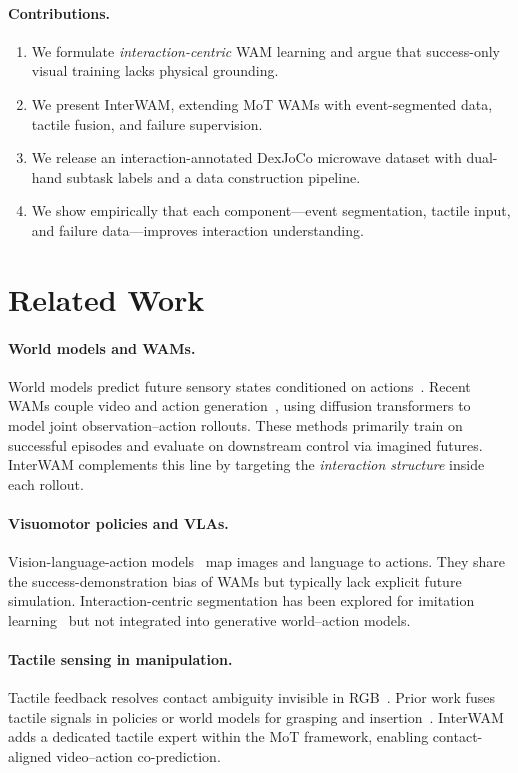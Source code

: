 \documentclass{article}
\begin{document}
\paragraph{Contributions.}
\begin{enumerate}
    \item We formulate \emph{interaction-centric} WAM learning and argue that success-only visual training lacks physical grounding.
    \item We present InterWAM, extending MoT WAMs with event-segmented data, tactile fusion, and failure supervision.
    \item We release an interaction-annotated DexJoCo microwave dataset with dual-hand subtask labels and a data construction pipeline.
    \item We show empirically that each component---event segmentation, tactile input, and failure data---improves interaction understanding.
\end{enumerate}

\section{Related Work}
\label{sec:related}

\paragraph{World models and WAMs.}
World models predict future sensory states conditioned on actions~\citep{ha2018world,hafner2023dreamer}.
Recent WAMs couple video and action generation~\citep{fastwam2026,cosmos2025,genie2024}, using diffusion transformers to model joint observation--action rollouts.
These methods primarily train on successful episodes and evaluate on downstream control via imagined futures.
InterWAM complements this line by targeting the \emph{interaction structure} inside each rollout.

\paragraph{Visuomotor policies and VLAs.}
Vision-language-action models~\citep{rt22023,openvla2024} map images and language to actions.
They share the success-demonstration bias of WAMs but typically lack explicit future simulation.
Interaction-centric segmentation has been explored for imitation learning~\citep{sharma2021dexterous} but not integrated into generative world--action models.

\paragraph{Tactile sensing in manipulation.}
Tactile feedback resolves contact ambiguity invisible in RGB~\citep{lee2019touch,yang2024tactile}.
Prior work fuses tactile signals in policies or world models for grasping and insertion~\citep{li2022visualtouch}.
InterWAM adds a dedicated tactile expert within the MoT framework, enabling contact-aligned video--action co-prediction.
\end{document}
